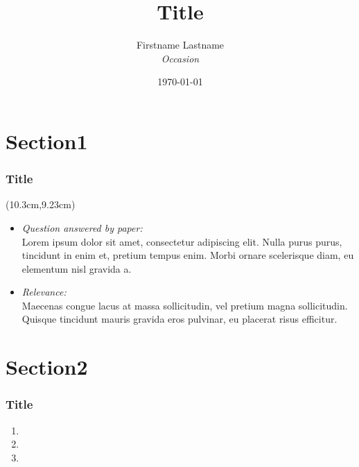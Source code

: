 \documentclass[13pt]{beamer}
\title {Title }
\author{Firstname Lastname\\[0.3cm]  
\textit{Occasion} }
\date{\today}
\begin{document}
\begin{frame}
\titlepage
\end{frame}


\section{Section1}
\setcounter{subsection}{1} %

\begin{frame}[label=title1]\frametitle{Title}
	\begin{textblock*}{3cm}(10.3cm,9.23cm)
		\hyperlink{appendix1}{}
	\end{textblock*}
\begin{itemize}		
	\item \textit{Question answered by paper:}\\[0.1cm]
	 Lorem ipsum dolor sit amet, consectetur adipiscing elit. Nulla purus purus, tincidunt in enim et, pretium tempus enim. Morbi ornare scelerisque diam, eu elementum nisl gravida a.\pause\item \textit{Relevance:} \\[0.1cm]
	Maecenas congue lacus at massa sollicitudin, vel pretium magna sollicitudin. Quisque tincidunt mauris gravida eros pulvinar, eu placerat risus efficitur.
\end{itemize}
\end{frame}


\section{Section2}
\setcounter{subsection}{1} %

\begin{frame}[label=title2]\frametitle{Title}
\begin{enumerate}
	\item 
	\pause\item 
	\pause\item 
\end{enumerate}		
\end{frame}
\end{document}
